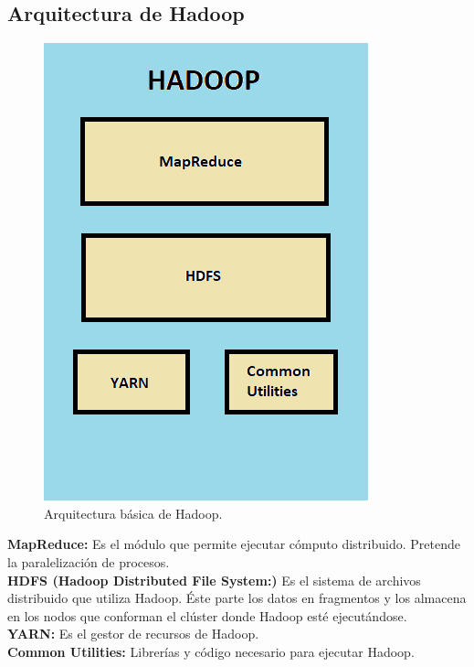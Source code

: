 \subsection{Arquitectura de Hadoop}
\begin{figure}[H]
	\begin{center}
		\hypertarget{fig:hadoopComponentes}{\hspace{1pt}}
		\includegraphics{capitulo2/images/hadoopComponentes.png}
		\caption{Arquitectura básica de Hadoop.}
		\label{fig:hadoopComponentes}
	\end{center}
\end{figure}

\begin{UClist}
	\UCli \textbf{MapReduce:} Es el módulo que permite ejecutar cómputo distribuido. Pretende la paralelización de procesos.\\
	\UCli \textbf{HDFS (Hadoop Distributed File System:)} Es el sistema de archivos distribuido que utiliza Hadoop. Éste parte los datos en fragmentos y los almacena en los nodos que conforman el clúster donde Hadoop esté ejecutándose.\\
	\UCli \textbf{YARN:} Es el gestor de recursos de Hadoop.\\
	\UCli \textbf{Common Utilities:} Librerías y código necesario para ejecutar Hadoop.\\
\end{UClist}

